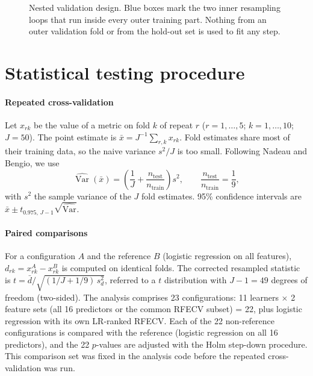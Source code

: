 \documentclass[11pt]{article}
\begin{document}
\begin{figure}[!htbp]
\caption{Nested validation design. Blue boxes mark the two inner resampling loops that run inside every outer training part. Nothing from an outer validation fold or from the hold-out set is used to fit any step.}
\label{fig:nested}
\end{figure}

\section{Statistical testing procedure}

\paragraph{Repeated cross-validation}
Let $x_{rk}$ be the value of a metric on fold $k$ of repeat $r$ ($r=1,\dots,5$; $k=1,\dots,10$; $J=50$). The point estimate is $\bar x = J^{-1}\sum_{r,k} x_{rk}$. Fold estimates share most of their training data, so the naive variance $s^2/J$ is too small. Following Nadeau and Bengio, we use
\begin{equation}
\widehat{\operatorname{Var}}(\bar x) = \left(\frac{1}{J} + \frac{n_{\mathrm{test}}}{n_{\mathrm{train}}}\right) s^2, \qquad \frac{n_{\mathrm{test}}}{n_{\mathrm{train}}} = \frac{1}{9},
\end{equation}
with $s^2$ the sample variance of the $J$ fold estimates. 95\% confidence intervals are $\bar x \pm t_{0.975,\,J-1}\sqrt{\widehat{\operatorname{Var}}}$.

\paragraph{Paired comparisons}
For a configuration $A$ and the reference $B$ (logistic regression on all features), $d_{rk} = x^{A}_{rk} - x^{B}_{rk}$ is computed on identical folds. The corrected resampled statistic is $t = \bar d / \sqrt{(1/J + 1/9)\,s_d^2}$, referred to a $t$ distribution with $J-1 = 49$ degrees of freedom (two-sided). The analysis comprises 23 configurations: 11 learners $\times$ 2 feature sets (all 16 predictors or the common RFECV subset) = 22, plus logistic regression with its own LR-ranked RFECV. Each of the 22 non-reference configurations is compared with the reference (logistic regression on all 16 predictors), and the 22 $p$-values are adjusted with the Holm step-down procedure. This comparison set was fixed in the analysis code before the repeated cross-validation was run.
\end{document}
